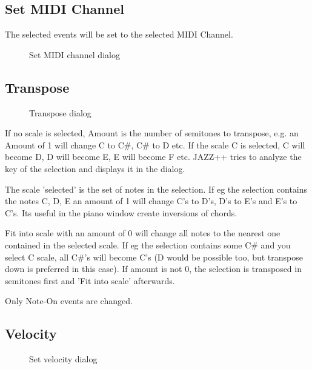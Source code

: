 \documentclass[letterpaper]{report}
\begin{document}
\subsection{Set MIDI Channel}\label{setchan}

The selected events will be set to the selected MIDI Channel.

\begin{figure}%
%
%
\caption{Set MIDI channel dialog}%
\end{figure}


\subsection{Transpose}\label{transpose}

\begin{figure}%
%
%
\caption{Transpose dialog}%
\end{figure}

If no scale is selected, Amount is the number of semitones to transpose, e.g. an
Amount of 1 will change C to C\#, C\# to D etc. If the scale C is selected, C
will become D, D will become E, E will become F etc. JAZZ++ tries to analyze
the key of the selection and displays it in the dialog.

The scale 'selected' is the set of notes in the selection. If eg the selection
contains the notes C, D, E an amount of 1 will change C's to D's, D's to E's and
E's to C's. Its useful in the piano window create inversions of chords.

Fit into scale with an amount of 0 will change all notes to the nearest one
contained in the selected scale. If eg the selection contains some C\# and you
select C scale, all C\#'s will become C's (D would be possible too, but transpose
down is preferred in this case). If amount is not 0, the selection is transposed
in semitones first and 'Fit into scale' afterwards.

Only Note-On events are changed.


\subsection{Velocity}\label{veloc}

\begin{figure}%
%
%
\caption{Set velocity dialog}%
\end{figure}
\end{document}
